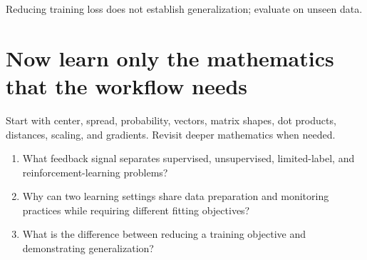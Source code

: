 \begin{keyidea}
Reducing training loss does not establish generalization; evaluate on unseen data.
\end{keyidea}

\section{Now learn only the mathematics that the workflow needs}

Start with center, spread, probability, vectors, matrix shapes, dot products, distances, scaling, and gradients. Revisit deeper mathematics when needed.

\begin{quickcheck}
\begin{enumerate}
  \item What feedback signal separates supervised, unsupervised, limited-label, and reinforcement-learning problems?
  \item Why can two learning settings share data preparation and monitoring practices while requiring different fitting objectives?
  \item What is the difference between reducing a training objective and demonstrating generalization?
\end{enumerate}
\end{quickcheck}
